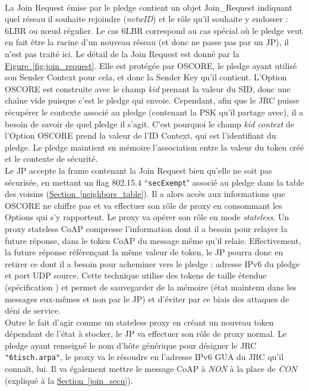 \documentclass[]{report}
\newcommand{\minit}[1]{\noindent{\small\textbf{ \underline{#1}}}~\\}
\newcommand{\wordlink}[2]{\hyperref[#2]{#1~\ref{#2}}}
\begin{document}
\vspace{0.1cm}

\minit{pledge $\rightarrow$ JP (Join Request)}

La Join Request émise par le pledge contient un objet Join\_Request indiquant quel réseau il souhaite rejoindre (\textit{netwID}) et le rôle qu'il souhaite y endosser : 6LBR ou nœud régulier. Le cas 6LBR correspond au cas spécial où le pledge veut en fait être la racine d'un nouveau réseau (et donc ne passe pas par un JP), il n'est pas traité ici. Le détail de la Join Request est donné par la \wordlink{Figure}{fig:join_request}. Elle est protégée par OSCORE, le pledge ayant utilisé son Sender Context pour cela, et donc la Sender Key qu'il contient. L'Option OSCORE est construite avec le champ \textit{kid} prenant la valeur du SID, donc une chaîne vide puisque c'est le pledge qui envoie. Cependant, afin que le JRC puisse récupérer le contexte associé au pledge (contenant la PSK qu'il partage avec), il a besoin de savoir de quel pledge il s'agit. C'est pourquoi le champ \textit{kid context} de l'Option OSCORE prend la valeur de l'ID Context, qui est l'identifiant du pledge. Le pledge maintient en mémoire l'association entre la valeur du token créé et le contexte de sécurité.\\

 Le JP accepte la frame contenant la Join Request bien qu'elle ne soit pas sécurisée, en mettant un flag 802.15.4 ``\texttt{secExempt}" associé au pledge dans la table des voisins (\wordlink{Section}{neighbors_table}). Il a alors accès aux informations que OSCORE ne chiffre pas et va effectuer son rôle de proxy en consommant les Options qui s'y rapportent. Le proxy va opérer son rôle en mode \textit{stateless}. Un proxy stateless CoAP \cite{ietf-core-stateless-05} compresse l'information dont il a besoin pour relayer la future réponse, dans le token CoAP du message même qu'il relaie. Effectivement, la future réponse référençant la même valeur de token, le JP pourra donc en retirer ce dont il a besoin pour acheminer vers le pledge : adresse IPv6 du pledge et port UDP source. Cette technique utilise des tokens de taille étendue (spécification \cite{ietf-core-stateless-05}) et permet de sauvegarder de la mémoire (état maintenu dans les messages eux-mêmes et non par le JP) et d'éviter par ce biais des attaques de déni de service.\\
 
 Outre le fait d'agir comme un stateless proxy en créant un nouveau token dépendant de l'état à stocker, le JP va effectuer son rôle de proxy normal. Le pledge ayant renseigné le nom d'hôte générique pour désigner le JRC \texttt{"6tisch.arpa"}, le proxy va le résoudre en l'adresse IPv6 GUA du JRC qu'il connaît, lui. Il va également mettre le message CoAP à \textit{NON} à la place de \textit{CON} (expliqué à la \wordlink{Section}{join_secu}).\\
\end{document}
